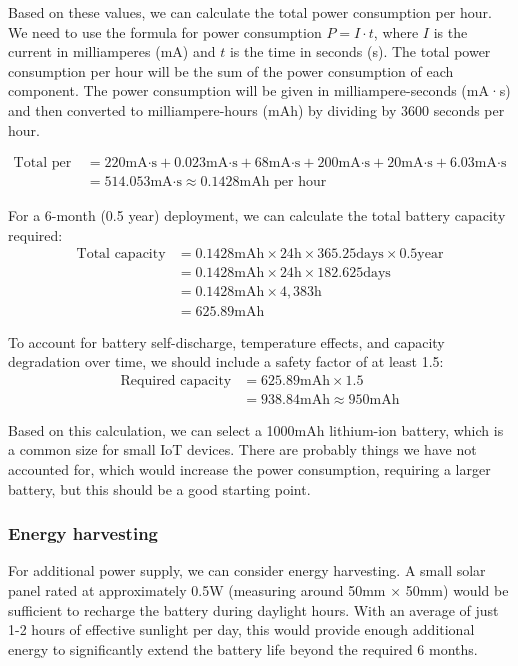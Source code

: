 Based on these values, we can calculate the total power consumption per hour.
We need to use the formula for power consumption $P = I \cdot t$, where $I$ is the current in milliamperes (mA) and $t$ is the time in seconds (s). The total power consumption per hour will be the sum of the power consumption of each component. The power consumption will be given in milliampere-seconds (mA·s) and then converted to milliampere-hours (mAh) by dividing by 3600 seconds per hour.

\begin{align*}
\text{Total per hour} &= 220\text{mA·s} + 0.023\text{mA·s} + 68\text{mA·s} + 200\text{mA·s} + 20\text{mA·s} + 6.03\text{mA·s} \\
&= 514.053\text{mA·s} \approx 0.1428\text{mAh per hour}
\end{align*}

For a 6-month (0.5 year) deployment, we can calculate the total battery capacity required:
\begin{align*}
\text{Total capacity} &= 0.1428\text{mAh} \times 24\text{h} \times 365.25\text{days} \times 0.5\text{year} \\
&= 0.1428\text{mAh} \times 24\text{h} \times 182.625\text{days} \\
&= 0.1428\text{mAh} \times 4,383\text{h} \\
&= 625.89\text{mAh}
\end{align*}

To account for battery self-discharge, temperature effects, and capacity degradation over time, we should include a safety factor of at least 1.5:
\begin{align*}
\text{Required capacity} &= 625.89\text{mAh} \times 1.5 \\
&= 938.84\text{mAh} \approx 950\text{mAh}
\end{align*}

Based on this calculation, we can select a 1000mAh lithium-ion battery, which is a common size for small IoT devices. There are probably things we have not accounted for, which would increase the power consumption, requiring a larger battery, but this should be a good starting point.

\subsubsection{Energy harvesting}
For additional power supply, we can consider energy harvesting.
A small solar panel rated at approximately 0.5W (measuring around 50mm × 50mm) would be sufficient to recharge the battery during daylight hours. With an average of just 1-2 hours of effective sunlight per day, this would provide enough additional energy to significantly extend the battery life beyond the required 6 months.

